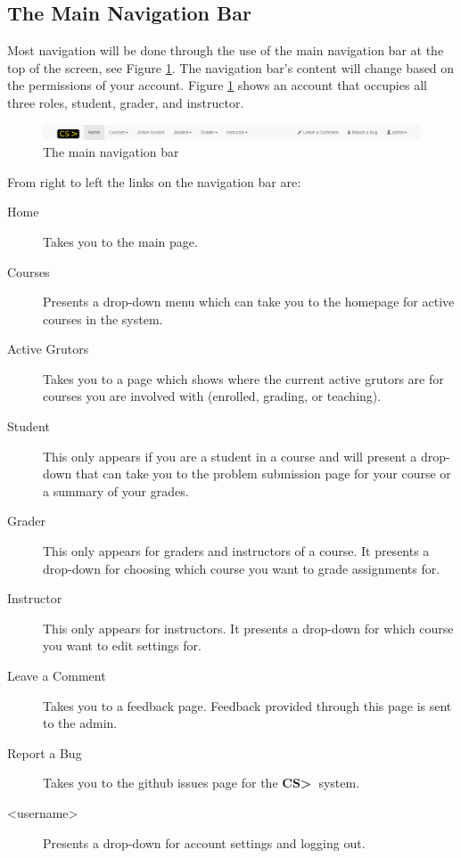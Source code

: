 \documentclass[11pt]{report}
\newcommand{\csgt}[0]{\textbf{CS\textgreater\ }}
\begin{document}
\subsection{The Main Navigation Bar}

Most navigation will be done through the use of the main navigation bar at the top of the screen, see
Figure \ref{fig:nav_bar}. The navigation bar's content will change based on the permissions of your
account. Figure \ref{fig:nav_bar} shows an account that occupies all three roles, student, grader, and
instructor.

\begin{figure}[h]
\centering
\includegraphics[width=\textwidth,height=\textheight,keepaspectratio]{diagrams/main_header}
\caption{The main navigation bar}
\label{fig:nav_bar}
\end{figure}

From right to left the links on the navigation bar are:
\begin{description}
\item[Home] Takes you to the main page.
\item[Courses] Presents a drop-down menu which can take you to the homepage for active courses in the system.
\item[Active Grutors] Takes you to a page which shows where the current active grutors are for
courses you are involved with (enrolled, grading, or teaching).
\item[Student] This only appears if you are a student in a course and will present a drop-down that can take
you to the problem submission page for your course or a summary of your grades.
\item[Grader] This only appears for graders and instructors of a course. It presents a drop-down for choosing
which course you want to grade assignments for.
\item[Instructor] This only appears for instructors. It presents a drop-down for which course you want to
edit settings for.
\item[Leave a Comment] Takes you to a feedback page. Feedback provided through this page is sent to the
admin.
\item[Report a Bug] Takes you to the github issues page for the \csgt system.
\item[\textless username\textgreater] Presents a drop-down for account settings and logging out.
\end{description}
\end{document}
